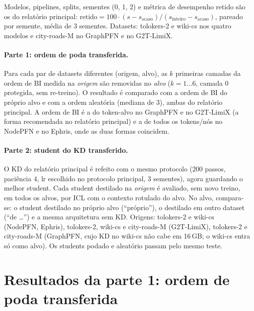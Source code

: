\documentclass[12pt,a4paper]{article}
\begin{document}
Modelos, pipelines, splits, sementes (0, 1, 2) e métrica de desempenho retido são os do relatório principal: $\text{retido} = 100\cdot(s - s_{\text{acaso}})/(s_{\text{inteiro}} - s_{\text{acaso}})$, pareado por semente, média de 3 sementes. Datasets: tolokers-2 e wiki-cs nos quatro modelos e city-roads-M no GraphPFN e no G2T-LimiX.

\paragraph{Parte 1: ordem de poda transferida.} Para cada par de datasets diferentes (origem, alvo), as $k$ primeiras camadas da ordem de BI medida na \emph{origem} são removidas no \emph{alvo} ($k = 1\ldots6$, camada 0 protegida, sem re-treino). O resultado é comparado com a ordem de BI do próprio alvo e com a ordem aleatória (mediana de 3), ambas do relatório principal. A ordem de BI é a do token-alvo no GraphPFN e no G2T-LimiX (a forma recomendada no relatório principal) e a de todos os tokens/nós no NodePFN e no Ephris, onde as duas formas coincidem.

\paragraph{Parte 2: student do KD transferido.} O KD do relatório principal é refeito com o mesmo protocolo (200 passos, paciência 4, lr escolhido no protocolo principal, 3 sementes), agora guardando o melhor student. Cada student destilado na \emph{origem} é avaliado, sem novo treino, em todos os alvos, por ICL com o contexto rotulado do alvo. No alvo, compara-se: o student destilado no próprio alvo (``próprio''), o destilado em outro dataset (``de \ldots'') e a mesma arquitetura sem KD. Origens: tolokers-2 e wiki-cs (NodePFN, Ephris), tolokers-2, wiki-cs e city-roads-M (G2T-LimiX), tolokers-2 e city-roads-M (GraphPFN, cujo KD no wiki-cs não cabe em 16\,GB; o wiki-cs entra só como alvo). Os students podado e aleatório passam pelo mesmo teste.

\section{Resultados da parte 1: ordem de poda transferida}

\begin{table}[H]
\centering
\caption{Retido no teste do alvo (\%) com 25\% e 50\% das camadas removidas ($k=3$ e $k=6$; no Ephris, $k=3$ e $k=5$). ``Transferida'' é a média sobre as origens.}
\label{tab:resumo}
\end{table}
\end{document}
